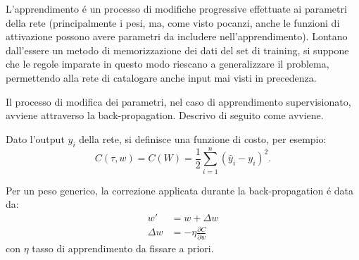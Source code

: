 \documentclass[a4paper,12pt]{report}
\begin{document}
 L'apprendimento \'e un processo di modifiche progressive effettuate ai parametri della rete (principalmente i pesi, ma, come visto pocanzi, anche le funzioni di attivazione possono avere parametri da includere nell'apprendimento). 
 Lontano dall'essere un metodo di memorizzazione dei dati del set di training, si suppone che le regole imparate in questo modo riescano a generalizzare il problema, permettendo alla rete di catalogare anche input mai visti in precedenza.
 
 Il processo di modifica dei parametri, nel caso di apprendimento supervisionato, avviene attraverso la back-propagation. 
 Descrivo di seguito come avviene.
 
 Dato l'output $y_i$ della rete, si definisce una funzione di costo, per esempio:
 \begin{equation}
  C(\tau,w) = C(W) = \frac{1}{2} \sum_{i=1}^n (\widehat{y}_i-y_i)^2.
 \end{equation}
 
 Per un peso generico, la correzione applicata durante la back-propagation \'e data da:
 \begin{align}
  w' &= w + \Delta w \\
  \Delta w &= - \eta \frac{\partial C}{\partial w}
 \end{align}
 con $\eta$ tasso di apprendimento da fissare a priori.
 
\end{document}
